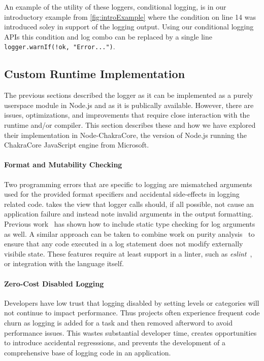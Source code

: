 An example of the utility of these loggers, conditional logging, is in our introductory 
example from \autoref{fig:introExample} where the condition on line 14 was introduced 
soley in support of the logging output. Using our conditional logging APIs this condition 
and log combo can be replaced by a single line \lstinline{logger.warnIf(!ok, "Error...")}.

\subsection{Custom Runtime Implementation}
\label{sec:runtimesupport}
The previous sections described the \projn logger as it can be implemented as a purely 
userspace module in Node.js and as it is publically available. However, there are 
issues, optimizations, and improvements that require close interaction with the 
runtime and/or compiler. This section describes these and how we have explored their 
implementation in Node-ChakraCore, the version of Node.js running the ChakraCore 
JavaScript engine from Microsoft. 

\paragraph{Format and Mutability Checking}
\noindent
Two programming errors that are specific to logging are mismatched arguments used 
for the provided format specifiers and accidental side-effects in logging related 
code. \projn takes the view that logger calls should, if all possible, not cause 
an application failure and instead note invalid arguments in the output formatting. 
Previous work~\cite{tyepcheckprintf} has shown how to include static type 
checking for log arguments as well. A similar approach can be taken to combine 
work on purity analysis~\cite{purity1,purity2} to ensure that any code executed 
in a log statement does not modify externally visibile state. These features require 
at least support in a linter, such as \emph{eslint}~\cite{eslint}, or integration 
with the language itself.

\paragraph{Zero-Cost Disabled Logging}
\noindent
Developers have low trust that logging disabled by setting levels or categories 
will not continue to impact performance. Thus projects often experience frequent 
code churn as logging is added for a task and then removed afterword to avoid 
performance issues. This wastes substantial developer time, creates opportunities 
to introduce accidental regresssions, and prevents the development of a comprehensive 
base of logging code in an application. 

